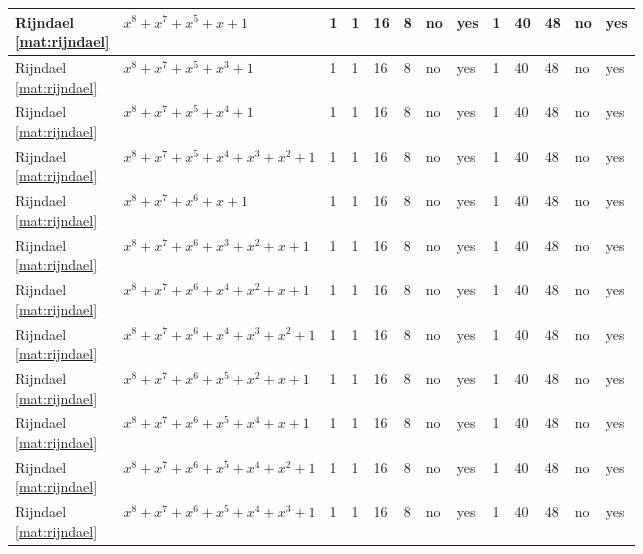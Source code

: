 \begin{tiny}
\begin{longtable}{|l|l|l|l|l|l|l|l|l|l|l|l|l|}
\shortstack{Rijndael \\ \eqref{mat:rijndael}} & $x^8 + x^7 + x^5 + x + 1$ & 1 & 1 & 16 & 8 & no & yes & 1 & 40 & 48 & no & yes \\ \hline
\shortstack{Rijndael \\ \eqref{mat:rijndael}} & $x^8 + x^7 + x^5 + x^3 + 1$ & 1 & 1 & 16 & 8 & no & yes & 1 & 40 & 48 & no & yes \\ \hline
\shortstack{Rijndael \\ \eqref{mat:rijndael}} & $x^8 + x^7 + x^5 + x^4 + 1$ & 1 & 1 & 16 & 8 & no & yes & 1 & 40 & 48 & no & yes \\ \hline
\shortstack{Rijndael \\ \eqref{mat:rijndael}} & $x^8 + x^7 + x^5 + x^4 + x^3 + x^2 + 1$ & 1 & 1 & 16 & 8 & no & yes & 1 & 40 & 48 & no & yes \\ \hline
\shortstack{Rijndael \\ \eqref{mat:rijndael}} & $x^8 + x^7 + x^6 + x + 1$ & 1 & 1 & 16 & 8 & no & yes & 1 & 40 & 48 & no & yes \\ \hline
\shortstack{Rijndael \\ \eqref{mat:rijndael}} & $x^8 + x^7 + x^6 + x^3 + x^2 + x + 1$ & 1 & 1 & 16 & 8 & no & yes & 1 & 40 & 48 & no & yes \\ \hline
\shortstack{Rijndael \\ \eqref{mat:rijndael}} & $x^8 + x^7 + x^6 + x^4 + x^2 + x + 1$ & 1 & 1 & 16 & 8 & no & yes & 1 & 40 & 48 & no & yes \\ \hline
\shortstack{Rijndael \\ \eqref{mat:rijndael}} & $x^8 + x^7 + x^6 + x^4 + x^3 + x^2 + 1$ & 1 & 1 & 16 & 8 & no & yes & 1 & 40 & 48 & no & yes \\ \hline
\shortstack{Rijndael \\ \eqref{mat:rijndael}} & $x^8 + x^7 + x^6 + x^5 + x^2 + x + 1$ & 1 & 1 & 16 & 8 & no & yes & 1 & 40 & 48 & no & yes \\ \hline
\shortstack{Rijndael \\ \eqref{mat:rijndael}} & $x^8 + x^7 + x^6 + x^5 + x^4 + x + 1$ & 1 & 1 & 16 & 8 & no & yes & 1 & 40 & 48 & no & yes \\ \hline
\shortstack{Rijndael \\ \eqref{mat:rijndael}} & $x^8 + x^7 + x^6 + x^5 + x^4 + x^2 + 1$ & 1 & 1 & 16 & 8 & no & yes & 1 & 40 & 48 & no & yes \\ \hline
\shortstack{Rijndael \\ \eqref{mat:rijndael}} & $x^8 + x^7 + x^6 + x^5 + x^4 + x^3 + 1$ & 1 & 1 & 16 & 8 & no & yes & 1 & 40 & 48 & no & yes \\ \hline

\end{longtable}
\end{tiny}
